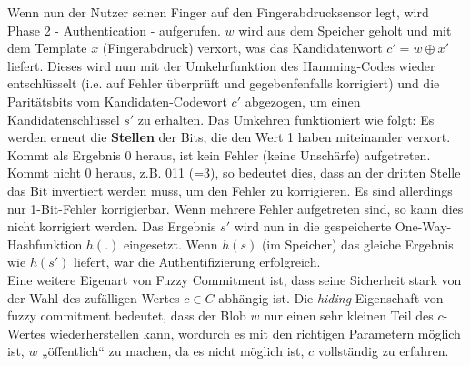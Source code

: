 \documentclass[12pt,a4paper]{article}
\begin{document}
Wenn nun der Nutzer seinen Finger auf den Fingerabdrucksensor legt, wird Phase 2 - Authentication - aufgerufen. $w$ wird aus dem Speicher geholt und mit dem Template $x$ (Fingerabdruck) verxort, was das Kandidatenwort $c' = w \oplus x'$ liefert. Dieses wird nun mit der Umkehrfunktion des Hamming-Codes wieder entschlüsselt (i.e. auf Fehler überprüft und gegebenfenfalls korrigiert) und die Paritätsbits vom Kandidaten-Codewort $c'$ abgezogen, um einen Kandidatenschlüssel $s'$ zu erhalten. Das Umkehren funktioniert wie folgt: Es werden erneut die \textbf{Stellen} der Bits, die den Wert 1 haben miteinander verxort. Kommt als Ergebnis 0 heraus, ist kein Fehler (keine Unschärfe) aufgetreten. Kommt nicht 0 heraus, z.B. 011 (=3), so bedeutet dies, dass an der dritten Stelle das Bit invertiert werden muss, um den Fehler zu korrigieren. Es sind allerdings nur 1-Bit-Fehler korrigierbar. Wenn mehrere Fehler aufgetreten sind, so kann dies nicht korrigiert werden. Das Ergebnis $s'$ wird nun in die gespeicherte One-Way-Hashfunktion $h(.)$ eingesetzt. Wenn $h(s)$ (im Speicher) das gleiche Ergebnis wie $h(s')$ liefert, war die Authentifizierung erfolgreich. \\

Eine weitere Eigenart von Fuzzy Commitment ist, dass seine Sicherheit stark von der Wahl des zufälligen Wertes $c\in C$ abhängig ist. Die \textit{hiding}-Eigenschaft von fuzzy commitment bedeutet, dass der Blob $w$ nur einen sehr kleinen Teil des $c$-Wertes wiederherstellen kann, wordurch es mit den richtigen Parametern möglich ist, $w$ „öffentlich“ zu machen, da es nicht möglich ist, $c$ vollständig zu erfahren.
\end{document}
